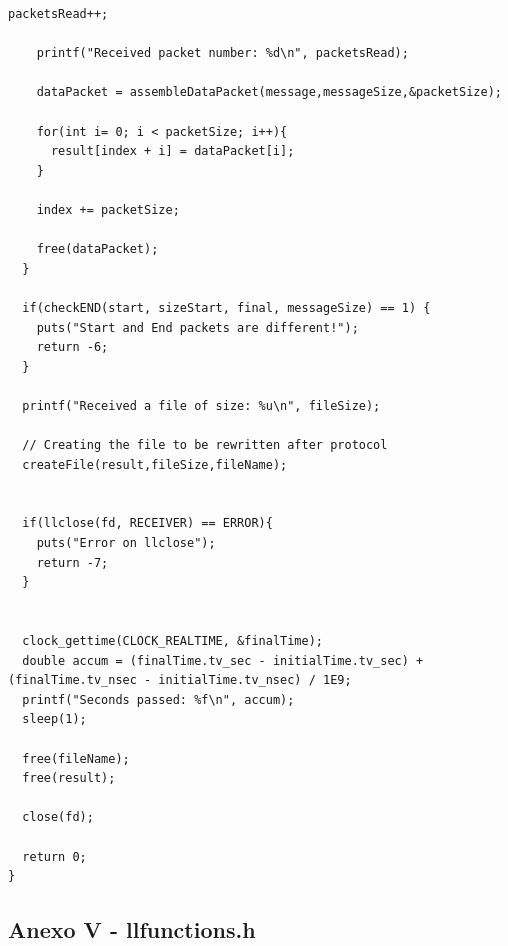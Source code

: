 \documentclass[11pt]{article}
\begin{document}
\begin{lstlisting}[style=CStyle]
    packetsRead++;
    
    printf("Received packet number: %d\n", packetsRead);

    dataPacket = assembleDataPacket(message,messageSize,&packetSize);

    for(int i= 0; i < packetSize; i++){
      result[index + i] = dataPacket[i];
    }

    index += packetSize;

    free(dataPacket);
  }
  
  if(checkEND(start, sizeStart, final, messageSize) == 1) {
    puts("Start and End packets are different!");
    return -6;
  }

  printf("Received a file of size: %u\n", fileSize);

  // Creating the file to be rewritten after protocol
  createFile(result,fileSize,fileName);


  if(llclose(fd, RECEIVER) == ERROR){
    puts("Error on llclose");
    return -7;
  }


  clock_gettime(CLOCK_REALTIME, &finalTime);
  double accum = (finalTime.tv_sec - initialTime.tv_sec) + (finalTime.tv_nsec - initialTime.tv_nsec) / 1E9;
  printf("Seconds passed: %f\n", accum);
  sleep(1);

  free(fileName);
  free(result);

  close(fd);

  return 0;
}
\end{lstlisting}

\pagebreak

\subsection{Anexo V - llfunctions.h}
\end{document}
